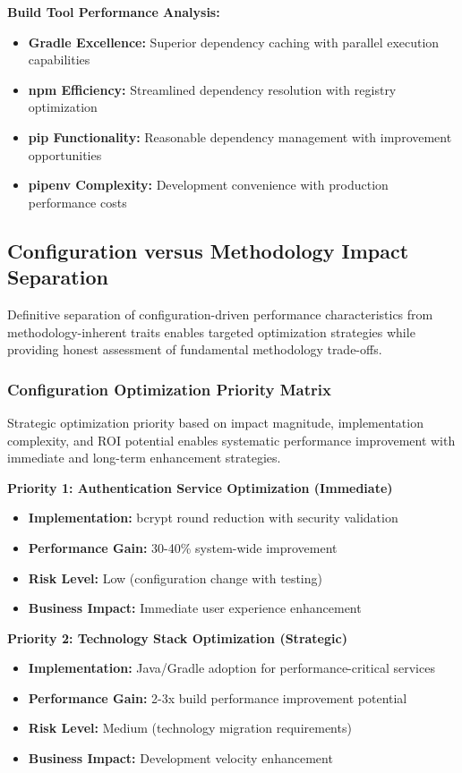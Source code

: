 \textbf{Build Tool Performance Analysis:}
\begin{itemize}
\item \textbf{Gradle Excellence:} Superior dependency caching with parallel execution capabilities
\item \textbf{npm Efficiency:} Streamlined dependency resolution with registry optimization
\item \textbf{pip Functionality:} Reasonable dependency management with improvement opportunities
\item \textbf{pipenv Complexity:} Development convenience with production performance costs
\end{itemize}

\subsection{Configuration versus Methodology Impact Separation}
\label{subsec:configuration_methodology}

Definitive separation of configuration-driven performance characteristics from methodology-inherent traits enables targeted optimization strategies while providing honest assessment of fundamental methodology trade-offs.

\subsubsection{Configuration Optimization Priority Matrix}

Strategic optimization priority based on impact magnitude, implementation complexity, and ROI potential enables systematic performance improvement with immediate and long-term enhancement strategies.



\textbf{Priority 1: Authentication Service Optimization (Immediate)}
\begin{itemize}
\item \textbf{Implementation:} bcrypt round reduction with security validation
\item \textbf{Performance Gain:} 30-40\% system-wide improvement
\item \textbf{Risk Level:} Low (configuration change with testing)
\item \textbf{Business Impact:} Immediate user experience enhancement
\end{itemize}

\textbf{Priority 2: Technology Stack Optimization (Strategic)}
\begin{itemize}
\item \textbf{Implementation:} Java/Gradle adoption for performance-critical services
\item \textbf{Performance Gain:} 2-3x build performance improvement potential
\item \textbf{Risk Level:} Medium (technology migration requirements)
\item \textbf{Business Impact:} Development velocity enhancement
\end{itemize}

